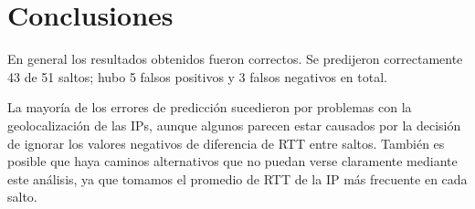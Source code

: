 \section{Conclusiones}

En general los resultados obtenidos fueron correctos. Se predijeron correctamente 43 de 51 saltos; hubo 5 falsos positivos y 3 falsos negativos en total.

La mayoría de los errores de predicción sucedieron por problemas con la geolocalización de las IPs, aunque algunos parecen estar causados por la decisión de ignorar los valores negativos de diferencia de RTT entre saltos. También es posible que haya caminos alternativos que no puedan verse claramente mediante este análisis, ya que tomamos el promedio de RTT de la IP más frecuente en cada salto.
